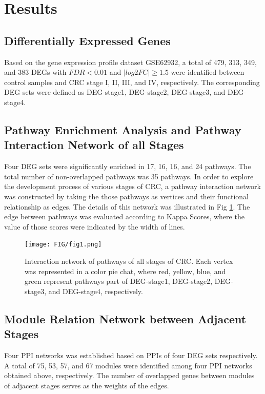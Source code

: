 \documentclass[conference]{IEEEtran}
\begin{document}
\section{Results}

\subsection{Differentially Expressed Genes}

Based on the gene expression profile dataset GSE62932, 
a total of 479, 313, 349, and 383 DEGs with $FDR < 0.01$ and $|log2FC|\geqslant 1.5$ were identified between control samples and CRC stage I, II, III, and IV, respectively.
The corresponding DEG sets were defined as DEG-stage1, DEG-stage2, DEG-stage3, and DEG-stage4.

\subsection{Pathway Enrichment Analysis and Pathway Interaction Network of all Stages}

Four DEG sets were significantly enriched in 17, 16, 16, and 24 pathways.
The total number of non-overlapped pathways was 35 pathways. 
In order to explore the development process of various stages of CRC, 
a pathway interaction network was constructed by taking the those pathways as vertices and their functional relationship as edges.  
The details of this network was illustrated in Fig \ref{Fig1}.
%
The edge between pathways was evaluated according to Kappa Scores,
where the value of those scores were indicated by the width of lines.


\begin{figure}[htbp]
	\centering
	\texttt{[image: FIG/fig1.png]}
	\caption{Interaction network of pathways of all stages of CRC. Each vertex was represented in a color pie chat, where
		red, yellow, blue, and green represent pathways part of DEG-stage1, DEG-stage2, DEG-stage3, and DEG-stage4, respectively.}
	\label{Fig1}
\end{figure}


\subsection{Module Relation Network between Adjacent Stages  }




Four PPI networks was established based on PPIs of four DEG sets respectively. 
A total of 75, 53, 57, and 67 modules were identified among four PPI networks obtained above, respectively.  
The number of overlapped genes between modules of adjacent stages serves as the weights of the edges. 
\end{document}
